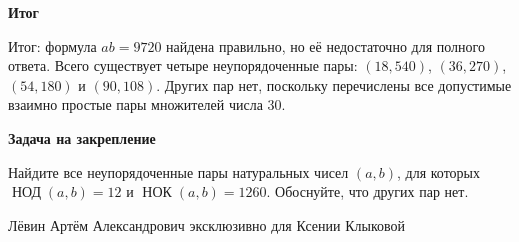 \documentclass[12pt,a4paper]{article}
\newcommand{\gcdru}{\mathop{\text{НОД}}\nolimits}
\newcommand{\lcmru}{\mathop{\text{НОК}}\nolimits}
\newcommand{\subheading}[1]{\par\smallskip\textbf{#1}\par}
\begin{document}
\subheading{Итог}
\textcolor{teal!60!black}{Итог:} формула $ab=9720$ найдена правильно, но её недостаточно для полного ответа. Всего существует четыре неупорядоченные пары: $(18,540)$, $(36,270)$, $(54,180)$ и $(90,108)$. Других пар нет, поскольку перечислены все допустимые взаимно простые пары множителей числа $30$.

\subheading{Задача на закрепление}
Найдите все неупорядоченные пары натуральных чисел $(a,b)$, для которых $\gcdru(a,b)=12$ и $\lcmru(a,b)=1260$. Обоснуйте, что других пар нет.

\vfill
\begin{center}
\footnotesize Лёвин Артём Александрович эксклюзивно для Ксении Клыковой
\end{center}
\end{document}
